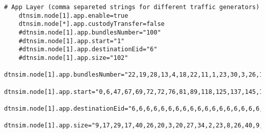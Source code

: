 \begin{lstlisting}[caption=inifile,label=inifile,]
    # App Layer (comma separeted strings for different traffic generators)			
    dtnsim.node[1].app.enable=true
    dtnsim.node[*].app.custodyTransfer=false
    #dtnsim.node[1].app.bundlesNumber="100"
    #dtnsim.node[1].app.start="1"				 
    #dtnsim.node[1].app.destinationEid="6"
    #dtnsim.node[1].app.size="102"
    dtnsim.node[1].app.bundlesNumber="22,19,28,13,4,18,22,11,1,23,30,3,26,18,1,9,7,5,17,1,13,1,19,4,3,21,23,17,10,28,6,23,14,8,12,30,24,10,11,25,16,26,3,22,5,12,6,14,23,7,9,15,12,9,9,7,25,30,15,8,16,4,9,19,13,26,22,6,26,26,12,13,19,25,25,28,10,17,12,14,18,21,21,24,11,8,3,22,26,21,19,17,5,11,29,30,17,22,5,26"
    dtnsim.node[1].app.start="0,6,47,67,69,72,72,76,81,89,118,125,137,145,148,153,177,193,199,253,253,256,263,274,276,279,282,290,300,346,357,367,373,389,393,394,402,413,425,428,435,437,454,455,464,473,476,530,534,537,550,555,559,581,584,589,597,598,598,604,609,618,630,652,660,662,669,671,672,681,688,698,705,721,722,753,762,767,788,792,801,814,826,848,860,873,877,881,882,910,929,932,932,938,940,957,969,986,992,999"
    dtnsim.node[1].app.destinationEid="6,6,6,6,6,6,6,6,6,6,6,6,6,6,6,6,6,6,6,6,6,6,6,6,6,6,6,6,6,6,6,6,6,6,6,6,6,6,6,6,6,6,6,6,6,6,6,6,6,6,6,6,6,6,6,6,6,6,6,6,6,6,6,6,6,6,6,6,6,6,6,6,6,6,6,6,6,6,6,6,6,6,6,6,6,6,6,6,6,6,6,6,6,6,6,6,6,6,6,6"
    dtnsim.node[1].app.size="9,17,29,17,40,26,20,3,20,27,34,2,23,8,26,40,9,26,16,28,25,26,22,37,11,31,22,36,20,33,32,24,15,30,15,34,26,17,7,19,34,16,30,11,33,24,9,37,29,12,27,36,13,26,7,32,34,9,3,8,19,6,39,11,32,19,35,25,33,37,6,36,4,28,7,2,9,12,2,26,13,35,32,27,38,6,14,5,12,31,28,21,2,17,3,37,32,1,38,2"
    
\end{lstlisting}